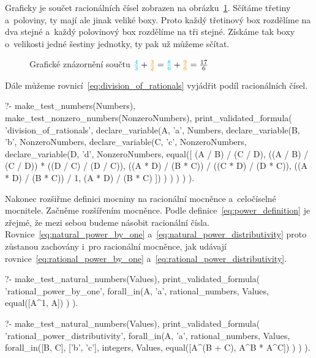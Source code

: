 Graficky je součet racionálních čísel zobrazen na obrázku~\ref{img:add_rational_numbers}. Sčítáme třetiny a~poloviny, ty mají ale jinak veliké boxy. Proto každý třetinový box rozdělíme na dva stejné a~každý polovinový box rozdělíme na tři stejné. Získáme tak boxy o~velikosti jedné šestiny jednotky, ty pak už můžeme sčítat.

\begin{figure}[!h]
\centering
{}
\caption{Grafické znázornění součtu \(\textcolor{cyan}{\frac{4}{3}} + \textcolor{orange}{\frac{3}{2}} = \textcolor{cyan}{\frac{8}{6}} + \textcolor{orange}{\frac{9}{6}} = \frac{17}{6}\)}
\label{img:add_rational_numbers}
\end{figure}

Dále můžeme rovnicí~\eqref{eq:division_of_rationals} vyjádřit podíl racionálních čísel.

\begin{prolog}
?-	make_test_numbers(Numbers),
	make_test_nonzero_numbers(NonzeroNumbers),
	print_validated_formula(
		'division_of_rationals',
		declare_variable(A, 'a', Numbers,
			declare_variable(B, 'b', NonzeroNumbers,
				declare_variable(C, 'c', NonzeroNumbers,
					declare_variable(D, 'd', NonzeroNumbers,
						equal([
							(A / B) / (C / D),
							((A / B) / (C / D)) * ((D / C) / (D / C)),
							((A * D) / (B * C)) / ((C * D) / (D * C)),
							((A * D) / (B * C)) / 1,
							(A * D) / (B * C)
						])
					)
				)
			)
		)
	).
\end{prolog}

Nakonec rozšiřme definici mocniny na racionální mocněnce a~celočíselné mocnitele. Začněme rozšířením mocněnce. Podle definice~\eqref{eq:power_definition} je zřejmé, že mezi sebou budeme násobit racionální čísla. Rovnice~\eqref{eq:natural_power_by_one} a~\eqref{eq:natural_power_distributivity} proto zůstanou zachovány i~pro racionální mocněnce, jak udávají rovnice~\eqref{eq:rational_power_by_one} a~\eqref{eq:rational_power_distributivity}.

\begin{fact}
\begin{prolog}
?-	make_test_natural_numbers(Values),
	print_validated_formula(
		'rational_power_by_one',
		forall_in(A, 'a', rational_numbers, Values,
			equal([A^1, A])
		)
	).				
\end{prolog}
\begin{prolog}
?-	make_test_natural_numbers(Values),
	print_validated_formula(
		'rational_power_distributivity',
		forall_in(A, 'a', rational_numbers, Values,
			forall_in([B, C], ['b', 'c'], integers, Values,
				equal([A^(B + C), A^B * A^C])
			)
		)
	).				
\end{prolog}
\end{fact}

